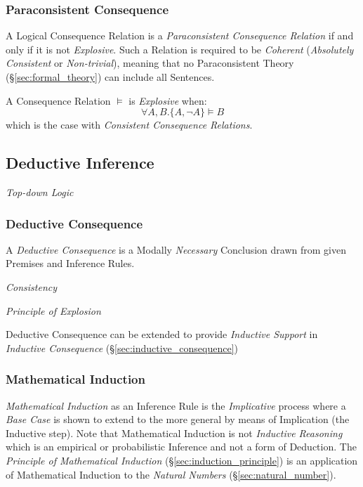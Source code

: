 \subsubsection{Paraconsistent Consequence}\label{sec:paraconsistent_consequence}

A Logical Consequence Relation is a \emph{Paraconsistent Consequence
  Relation} if and only if it is not \emph{Explosive}. Such a Relation
is required to be \emph{Coherent} (\emph{Absolutely Consistent} or
\emph{Non-trivial}), meaning that no Paraconsistent Theory
(\S\ref{sec:formal_theory}) can include all Sentences.

A Consequence Relation $\vDash$ is \emph{Explosive} when:
\[
    \forall A, B. \{A, \neg A\} \vDash B
\]
which is the case with \emph{Consistent Consequence Relations}.




\subsection{Deductive Inference}\label{sec:deductive_inference}

\emph{Top-down Logic}

\subsubsection{Deductive Consequence}\label{sec:deductive_consequence}

A \emph{Deductive Consequence} is a Modally \emph{Necessary}
Conclusion drawn from given Premises and Inference Rules.

\emph{Consistency}

\emph{Principle of Explosion}

Deductive Consequence can be extended to provide \emph{Inductive
  Support} in \emph{Inductive Consequence}
(\S\ref{sec:inductive_consequence})



\subsubsection{Mathematical Induction}\label{sec:mathematical_induction}

\emph{Mathematical Induction} as an Inference Rule is the
\emph{Implicative} process where a \emph{Base Case} is shown to extend
to the more general by means of Implication (the Inductive step). Note
that Mathematical Induction is not \emph{Inductive Reasoning} which is
an empirical or probabilistic Inference and not a form of Deduction.
The \emph{Principle of Mathematical Induction}
(\S\ref{sec:induction_principle}) is an application of Mathematical
Induction to the \emph{Natural Numbers} (\S\ref{sec:natural_number}).




